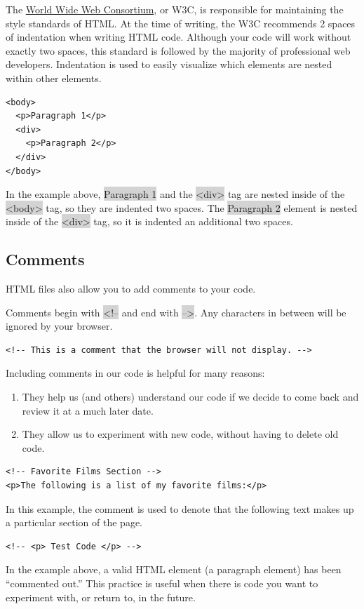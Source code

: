 \documentclass[11pt]{article}
\begin{document}
The \href{https://www.w3.org/Consortium/}{World Wide Web Consortium}, or W3C, is responsible for maintaining the style standards of HTML. At the time of writing, the W3C recommends 2 spaces of indentation when writing HTML code. Although your code will work without exactly two spaces, this standard is followed by the majority of professional web developers. Indentation is used to easily visualize which elements are nested within other elements.
\begin{lstlisting}
<body>
  <p>Paragraph 1</p>
  <div>
    <p>Paragraph 2</p>
  </div>
</body>
\end{lstlisting}
In the example above, \colorbox{lightgray}{Paragraph 1} and the \colorbox{lightgray}{<div>} tag are nested inside of the \colorbox{lightgray}{<body>} tag, so they are indented two spaces. The \colorbox{lightgray}{Paragraph 2} element is nested inside of the \colorbox{lightgray}{<div>} tag, so it is indented an additional two spaces.

\subsection{Comments}
HTML files also allow you to add comments to your code.

Comments begin with \colorbox{lightgray}{<!--} and end with \colorbox{lightgray}{-->}. Any characters in between will be ignored by your browser.
\begin{lstlisting}
<!-- This is a comment that the browser will not display. -->
\end{lstlisting}
Including comments in our code is helpful for many reasons:
\begin{enumerate}[leftmargin = *]
\item They help us (and others) understand our code if we decide to come back and review it at a much later date.
\item They allow us to experiment with new code, without having to delete old code.
\end{enumerate}
\begin{lstlisting}
<!-- Favorite Films Section -->
<p>The following is a list of my favorite films:</p>
\end{lstlisting}
In this example, the comment is used to denote that the following text makes up a particular section of the page.
\begin{lstlisting}
<!-- <p> Test Code </p> -->
\end{lstlisting}
In the example above, a valid HTML element (a paragraph element) has been “commented out.” This practice is useful when there is code you want to experiment with, or return to, in the future.
\end{document}
